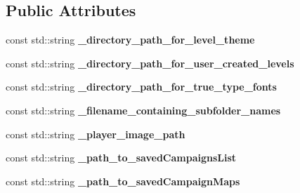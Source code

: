 \subsection*{Public Attributes}
\begin{DoxyCompactItemize}
\item 
\hypertarget{class_singleton_file_path_and_folder_manager_a7865eee86450b8406bbaf281271b2d4c}{}\label{class_singleton_file_path_and_folder_manager_a7865eee86450b8406bbaf281271b2d4c} 
const std\+::string {\bfseries \+\_\+directory\+\_\+path\+\_\+for\+\_\+level\+\_\+theme}
\item 
\hypertarget{class_singleton_file_path_and_folder_manager_a44eb54abfd0edf0af6852f9fc55dbe25}{}\label{class_singleton_file_path_and_folder_manager_a44eb54abfd0edf0af6852f9fc55dbe25} 
const std\+::string {\bfseries \+\_\+directory\+\_\+path\+\_\+for\+\_\+user\+\_\+created\+\_\+levels}
\item 
\hypertarget{class_singleton_file_path_and_folder_manager_a49e09e7147a23c4191940ad1b25e263d}{}\label{class_singleton_file_path_and_folder_manager_a49e09e7147a23c4191940ad1b25e263d} 
const std\+::string {\bfseries \+\_\+directory\+\_\+path\+\_\+for\+\_\+true\+\_\+type\+\_\+fonts}
\item 
\hypertarget{class_singleton_file_path_and_folder_manager_ac245e5c6b043cfcd725e1a84415972fa}{}\label{class_singleton_file_path_and_folder_manager_ac245e5c6b043cfcd725e1a84415972fa} 
const std\+::string {\bfseries \+\_\+filename\+\_\+containing\+\_\+subfolder\+\_\+names}
\item 
\hypertarget{class_singleton_file_path_and_folder_manager_a804996681de0abf7e537cad3c9db51c7}{}\label{class_singleton_file_path_and_folder_manager_a804996681de0abf7e537cad3c9db51c7} 
const std\+::string {\bfseries \+\_\+player\+\_\+image\+\_\+path}
\item 
\hypertarget{class_singleton_file_path_and_folder_manager_ac5a40bad0974d6e68215d074fcb8d5d9}{}\label{class_singleton_file_path_and_folder_manager_ac5a40bad0974d6e68215d074fcb8d5d9} 
const std\+::string {\bfseries \+\_\+path\+\_\+to\+\_\+saved\+Campaigns\+List}
\item 
\hypertarget{class_singleton_file_path_and_folder_manager_a474e75c750a6afd10e67c2b2dee1ea5c}{}\label{class_singleton_file_path_and_folder_manager_a474e75c750a6afd10e67c2b2dee1ea5c} 
const std\+::string {\bfseries \+\_\+path\+\_\+to\+\_\+saved\+Campaign\+Maps}
\item 
\hypertarget{class_singleton_file_path_and_folder_manager_a68aa325b898639b288c207ff96ba9258}{}\label{class_singleton_file_path_and_folder_manager_a68aa325b898639b288c207ff96ba9258} 

\end{DoxyCompactItemize}
